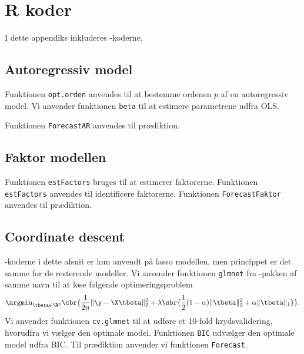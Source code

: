 \chapter{R koder} \label{app:r_koder}
I dette appendiks inkluderes \Rlang -koderne. 

\section{Autoregressiv model} \label{sec:auto}
Funktionen \texttt{opt.orden} anvendes til at bestemme ordenen $p$ af en autoregressiv model.  
%
Vi anvender funktionen \texttt{beta} til at estimere parametrene udfra OLS. 

Funktionen \texttt{ForecastAR} anvendes til prædiktion.

\section{Faktor modellen} \label{sec:faktor}
Funktionen \texttt{estFactors} bruges til at estimerer faktorerne.
%
Funktionen \texttt{estFactors} anvendes til identificere faktorerne. 
%
%
Funktionen \texttt{ForecastFaktor} anvendes til prædiktion.

\section{Coordinate descent} \label{sec:apprkodercoordinate}
\Rlang-koderne i dette afsnit er kun anvendt på lasso modellen, men princippet er det samme for de resterende modeller.  
Vi anvender funktionen \texttt{glmnet} fra \Rlang-pakken  af samme navn til at løse følgende optimeringsproblem 
\begin{align*}
\argmin_{\tbeta \in \R^p} \cbr{ \frac{1}{2n} \Vert \y - \X \tbeta \Vert_2^2 + \lambda \sbr{\frac{1}{2}(1- \alpha) \Vert \tbeta \Vert_2^2 + \alpha \Vert \tbeta \Vert_1}}.
\end{align*}
%
Vi anvender funktionen \texttt{cv.glmnet} til at udføre et 10-fold krydsvalidering, hvorudfra vi vælger den optimale model. 
%
Funktionen \texttt{BIC} udvælger den optimale model udfra BIC. 
%
Til prædiktion anvender vi funktionen \texttt{Forecast}.



